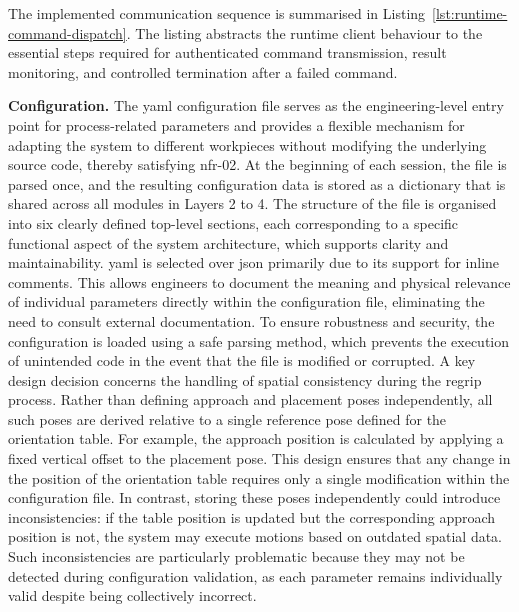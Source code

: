 The implemented communication sequence is summarised in Listing~\ref{lst:runtime-command-dispatch}. The listing abstracts the runtime client behaviour to the essential steps required for authenticated command transmission, result monitoring, and controlled termination after a failed command.



\FloatBarrier

\label{sec:configuration-architecture}
\noindent\textbf{Configuration.}
The \ac{yaml} configuration file serves as the engineering-level entry point for process-related parameters and provides a flexible mechanism for adapting the system to different workpieces without modifying the underlying source code, thereby satisfying \acs{nfr}-02. At the beginning of each session, the file is parsed once, and the resulting configuration data is stored as a dictionary that is shared across all modules in Layers 2 to 4. The structure of the file is organised into six clearly defined top-level sections, each corresponding to a specific functional aspect of the system architecture, which supports clarity and maintainability.
\ac{yaml} is selected over \ac{json} primarily due to its support for inline comments. This allows engineers to document the meaning and physical relevance of individual parameters directly within the configuration file, eliminating the need to consult external documentation. To ensure robustness and security, the configuration is loaded using a safe parsing method, which prevents the execution of unintended code in the event that the file is modified or corrupted.
A key design decision concerns the handling of spatial consistency during the regrip process. Rather than defining approach and placement poses independently, all such poses are derived relative to a single reference pose defined for the orientation table. For example, the approach position is calculated by applying a fixed vertical offset to the placement pose. This design ensures that any change in the position of the orientation table requires only a single modification within the configuration file. In contrast, storing these poses independently could introduce inconsistencies: if the table position is updated but the corresponding approach position is not, the system may execute motions based on outdated spatial data. Such inconsistencies are particularly problematic because they may not be detected during configuration validation, as each parameter remains individually valid despite being collectively incorrect.

